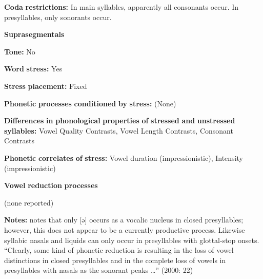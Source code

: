 \begin{styleBody}
\textbf{Coda} \textbf{restrictions:} In main syllables, apparently all consonants occur. In presyllables, only sonorants occur.
\end{styleBody}

\begin{styleBody}
\textbf{Suprasegmentals}
\end{styleBody}

\begin{styleBody}
\textbf{Tone:} No
\end{styleBody}

\begin{styleBody}
\textbf{Word} \textbf{stress:} Yes
\end{styleBody}

\begin{styleBody}
\textbf{Stress} \textbf{placement:} Fixed
\end{styleBody}

\begin{styleBody}
\textbf{Phonetic} \textbf{processes} \textbf{conditioned} \textbf{by} \textbf{stress:} (None)
\end{styleBody}

\begin{styleBody}
\textbf{Differences} \textbf{in} \textbf{phonological} \textbf{properties} \textbf{of} \textbf{stressed} \textbf{and} \textbf{unstressed} \textbf{syllables:} Vowel Quality Contrasts, Vowel Length Contrasts, Consonant Contrasts
\end{styleBody}

\begin{styleBody}
\textbf{Phonetic} \textbf{correlates} \textbf{of} \textbf{stress:} Vowel duration (impressionistic), Intensity (impressionistic)
\end{styleBody}

\begin{styleBody}
\textbf{Vowel} \textbf{reduction} \textbf{processes}
\end{styleBody}

\begin{styleBody}
(none reported)
\end{styleBody}

\begin{styleBody}
\textbf{Notes:} \citet{Alves2000} notes that only [ə] occurs as a vocalic nucleus in closed presyllables; however, this does not appear to be a currently productive process. Likewise syllabic nasals and liquids can only occur in presyllables with glottal-stop onsets. “Clearly, some kind of phonetic reduction is resulting in the loss of vowel distinctions in closed presyllables and in the complete loss of vowels in presyllables with nasals as the sonorant peaks …” (2000: 22)
\end{styleBody}

